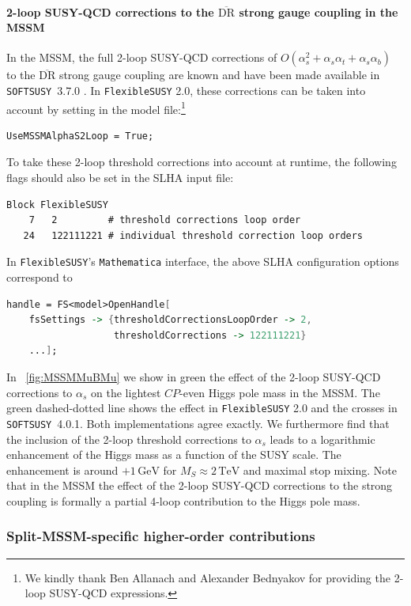 \documentclass[final,3p,11pt,pdflatex]{elsarticle}
\makeatletter
\newcommand{\fs}{\texttt{FlexibleSUSY}\@\xspace}
\newcommand{\softsusy}{\texttt{SOFTSUSY}\@\xspace}
\newcommand{\fstwo}{\fs 2.0\@\xspace}
\newcommand{\mathematica}{\texttt{Ma\-the\-ma\-ti\-ca}\xspace}
\newcommand{\ol}[1]{\overline{#1}}
\newcommand{\DRbar}{\ensuremath{\ol{\text{DR}}}\xspace}
\newcommand{\unit}[1]{\,\text{#1}}      %
\newcommand{\MS}{\ensuremath{M_S}\xspace}
\newcommand{\figref}[1]{\figurename~\ref{#1}}
\newcommand{\CP}{\ensuremath{CP}\xspace}
\newcommand{\SQCD}{SUSY-QCD\xspace}
\def\at{\alpha_t}
\def\ab{\alpha_b}
\def\as{\alpha_s}
\makeatother
\begin{document}
\paragraph{2-loop \SQCD corrections to the \DRbar strong gauge coupling in the MSSM}

In the MSSM, the full 2-loop \SQCD corrections of
$O(\as^2 + \as\at + \as\ab)$ to the \DRbar strong gauge coupling are known
\cite{Harlander:2005wm,Bauer:2008bj,Bednyakov:2010ni} and have been
made available in \softsusy~3.7.0 \cite{Allanach:2014nba}.  In \fstwo,
these corrections can be taken into account by setting in the model
file:\footnote{We kindly thank Ben Allanach and Alexander Bednyakov
  for providing the 2-loop \SQCD expressions.}
%
\begin{lstlisting}
UseMSSMAlphaS2Loop = True;
\end{lstlisting}
%
To take these 2-loop threshold corrections into account at runtime, the
following flags should also be set in the SLHA input file:
%
\begin{lstlisting}
Block FlexibleSUSY
    7   2         # threshold corrections loop order
   24   122111221 # individual threshold correction loop orders
\end{lstlisting}
%
In \fs's \mathematica interface, the above SLHA configuration options
correspond to
%
\begin{lstlisting}[language=Mathematica]
handle = FS<model>OpenHandle[
    fsSettings -> {thresholdCorrectionsLoopOrder -> 2,
                   thresholdCorrections -> 122111221}
    ...];
\end{lstlisting}
%
In \figref{fig:MSSMMuBMu} we show in green the effect of the 2-loop
\SQCD corrections to $\as$ on the lightest \CP-even Higgs pole
mass in the MSSM\@.  The green dashed-dotted line shows the effect in
\fstwo and the crosses in \softsusy~4.0.1.  Both implementations agree
exactly.  We furthermore find that the inclusion of the 2-loop
threshold corrections to $\as$ leads to a logarithmic enhancement
of the Higgs mass as a function of the SUSY scale.  The enhancement is
around $+1\unit{GeV}$ for $\MS\approx 2\unit{TeV}$ and maximal stop
mixing.
%
Note that in the MSSM the effect of the 2-loop \SQCD corrections to
the strong coupling is formally a partial 4-loop contribution to the
Higgs pole mass.

\subsubsection{Split-MSSM-specific higher-order contributions}
\end{document}

